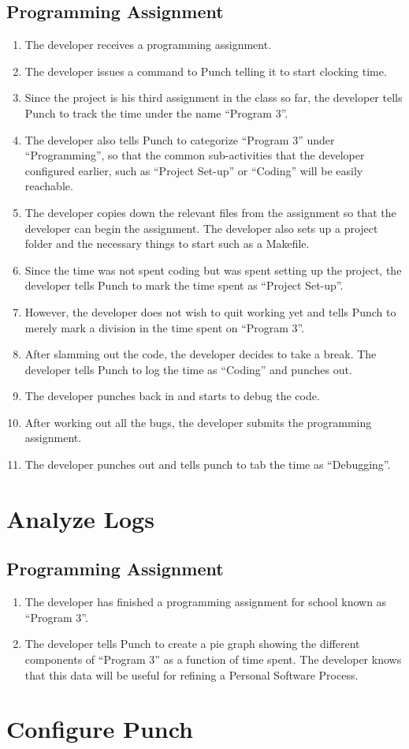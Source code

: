 \documentclass{article}
\begin{document}
\begin{empfile}
\subsection{ Programming Assignment }
    \begin{enumerate}
    \item The developer receives a programming assignment.
    \item The developer issues a command to Punch telling it to start clocking time.
    \item Since the project is his third assignment in the class so far, the developer tells Punch to track the time
          under the name ``Program 3''.
    \item The developer also tells Punch to categorize ``Program 3'' under ``Programming'', so that the common sub-activities
          that the developer configured earlier, such as ``Project Set-up'' or ``Coding'' will be easily reachable.
    \item The developer copies down the relevant files from the assignment so that the developer can begin the assignment.
          The developer also sets up a project folder and the necessary things to start such as a Makefile.
    \item Since the time was not spent coding but was spent setting up the project, the developer tells Punch to 
          mark the time spent as ``Project Set-up''.
    \item However, the developer does not wish to quit working yet and tells Punch to merely mark a division in the time spent
          on ``Program 3''.
    \item After slamming out the code, the developer decides to take a break. 
          The developer tells Punch to log the time as ``Coding'' and punches out.
    \item The developer punches back in and starts to debug the code.
    \item After working out all the bugs, the developer submits the programming assignment.
    \item The developer punches out and tells punch to tab the time as ``Debugging''.
        \end{enumerate}

\section{ Analyze Logs }
\subsection{ Programming Assignment }
    \begin{enumerate}
    \item The developer has finished a programming assignment for school known as ``Program 3''.
    \item The developer tells Punch to create a pie graph showing the different components of ``Program 3'' as a function of
          time spent. The developer knows that this data will be useful for refining a Personal Software Process.
    \end{enumerate}

\section{ Configure Punch }
\end{empfile}
\end{document}
